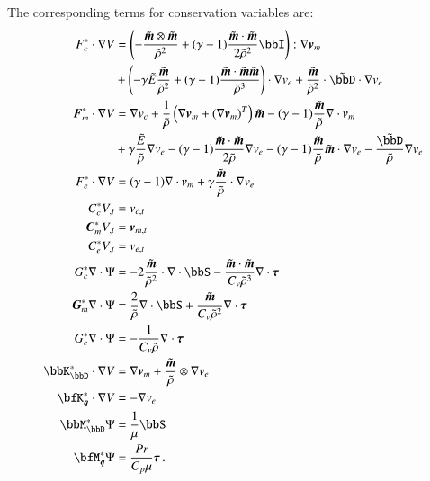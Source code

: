 \documentclass[preprint,12pt]{elsarticle}
\begin{document}
The corresponding terms for conservation variables are:
\begin{align*}
F^*_c\cdot\Grad V&=\LRp{-\frac{\tilde\bfm\otimes\tilde\bfm}{\tilde\rho^2}+(\gamma-1)\frac{\tilde\bfm\cdot\tilde\bfm}{2\tilde\rho^2}\bbI}:\Grad\bfv_m\\
&+\LRp{-\gamma\tilde E\frac{\tilde\bfm}{\tilde\rho^2}+(\gamma-1)\frac{\tilde\bfm\cdot\tilde\bfm\tilde\bfm}{\tilde\rho^3}}\cdot\Grad v_e
+\frac{\tilde\bfm}{\tilde\rho^2}\cdot\tilde\bbD\cdot\Grad v_e
\\
\bfF^*_m\cdot\Grad V&=\Grad v_c
+\frac{1}{\tilde\rho}\LRp{\Grad\bfv_m+(\Grad\bfv_m)^T}\tilde\bfm-(\gamma-1)\frac{\tilde\bfm}{\tilde\rho}\Div\bfv_m\\
&+\gamma\frac{\tilde E}{\tilde\rho}\Grad v_e-(\gamma-1)\frac{\tilde\bfm\cdot\tilde\bfm}{2\tilde\rho}\Grad v_e
-(\gamma-1)\frac{\tilde\bfm}{\tilde\rho}\tilde\bfm\cdot\Grad v_e
-\frac{\tilde\bbD}{\tilde\rho}\Grad v_e
\\
F^*_e\cdot\Grad V&=(\gamma-1)\Div\bfv_m
+\gamma\frac{\tilde\bfm}{\tilde\rho}\cdot\Grad v_e
\\
%
C^*_cV_{,t}&=v_{c,t}\\
\bfC^*_mV_{,t}&=\bfv_{m,t}\\
C^*_eV_{,t}&=v_{e,t}\\
%
G^*_c\Div\Psi&=-2\frac{\tilde\bfm}{\tilde\rho^2}\cdot\Div\bbS
-\frac{\tilde\bfm\cdot\tilde\bfm}{C_v\tilde\rho^3}\Div\bftau
\\
\bfG^*_m\Div\Psi&=\frac{2}{\tilde\rho}\Div\bbS+\frac{\tilde\bfm}{C_v\tilde\rho^2}\Div\bftau
\\
G^*_e\Div\Psi&=-\frac{1}{C_v\tilde\rho}\Div\bftau\\
%
\bbK^*_\bbD\cdot\Grad V&=\Grad\bfv_m+\frac{\tilde\bfm}{\tilde\rho}\otimes\Grad v_e\\
\bfK^*_{\bfq}\cdot\Grad V&=-\Grad v_e\\
%
\bbM^*_\bbD\Psi&=\frac{1}{\mu}\bbS\\
\bfM^*_{\bfq}\Psi&=\frac{Pr}{C_p\mu}\bftau\,.
\end{align*}
\end{document}
